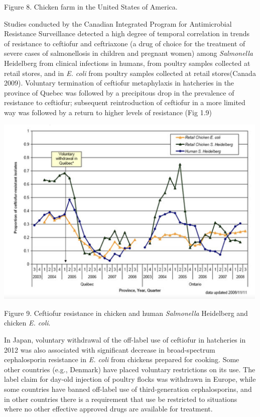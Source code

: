 \documentclass[]{tufte-handout}
\begin{document}
Figure 8. Chicken farm in the United States of America.

Studies conducted by the Canadian Integrated Program for Antimicrobial
Resistance Surveillance detected a high degree of temporal correlation
in trends of resistance to ceftiofur and ceftriaxone (a drug of choice
for the treatment of severe cases of salmonellosis in children and
pregnant women) among \emph{Salmonella} Heidelberg from clinical
infections in humans, from poultry samples collected at retail stores,
and in \emph{E. coli} from poultry samples collected at retail
stores(Canada 2009). Voluntary termination of ceftiofur metaphylaxis in
hatcheries in the province of Quebec was followed by a precipitous drop
in the prevalence of resistance to ceftiofur; subsequent reintroduction
of ceftiofur in a more limited way was followed by a return to higher
levels of resistance (Fig 1.9)

\includegraphics[width=5.20833in,height=\textheight]{images/Canada_ecoli.png}

Figure 9. Ceftiofur resistance in chicken and human \emph{Salmonella}
Heidelberg and chicken \emph{E. coli}.

In Japan, voluntary withdrawal of the off-label use of ceftiofur in
hatcheries in 2012 was also associated with significant decrease in
broad-spectrum cephalosporin resistance in \emph{E. coli} from chickens
prepared for cooking. Some other countries (e.g., Denmark) have placed
voluntary restrictions on its use. The label claim for day-old injection
of poultry flocks was withdrawn in Europe, while some countries have
banned off-label use of third-generation cephalosporins, and in other
countries there is a requirement that use be restricted to situations
where no other effective approved drugs are available for treatment.
\end{document}
